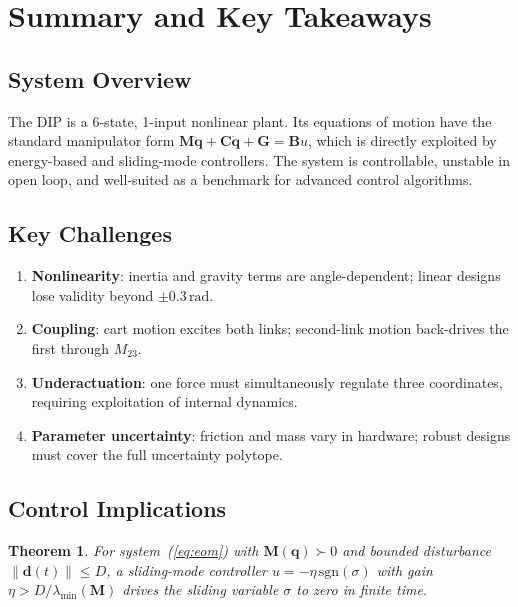 \documentclass[11pt,a4paper]{article}
\newtheorem{theorem}{Theorem}[section]
\begin{document}
\section{Summary and Key Takeaways}

\subsection{System Overview}

The DIP is a 6-state, 1-input nonlinear plant.  Its equations of motion have
the standard manipulator form
$\mathbf{M}\ddot{\mathbf{q}} + \mathbf{C}\dot{\mathbf{q}}
+ \mathbf{G} = \mathbf{B}u$, which is directly exploited by energy-based and
sliding-mode controllers.  The system is controllable, unstable in open loop,
and well-suited as a benchmark for advanced control algorithms.

\subsection{Key Challenges}

\begin{enumerate}
    \item \textbf{Nonlinearity}: inertia and gravity terms are angle-dependent;
          linear designs lose validity beyond $\pm 0.3\,\mathrm{rad}$.
    \item \textbf{Coupling}: cart motion excites both links; second-link motion
          back-drives the first through $M_{23}$.
    \item \textbf{Underactuation}: one force must simultaneously regulate three
          coordinates, requiring exploitation of internal dynamics.
    \item \textbf{Parameter uncertainty}: friction and mass vary in hardware;
          robust designs must cover the full uncertainty polytope.
\end{enumerate}

\subsection{Control Implications}

\begin{theorem}
For system~(\ref{eq:eom}) with $\mathbf{M}(\mathbf{q}) \succ 0$ and bounded
disturbance $\|\mathbf{d}(t)\| \leq D$, a sliding-mode controller
$u = -\eta\,\mathrm{sgn}(\sigma)$ with gain $\eta > D / \lambda_{\min}(\mathbf{M})$
drives the sliding variable $\sigma$ to zero in finite time.
\end{theorem}
\end{document}

